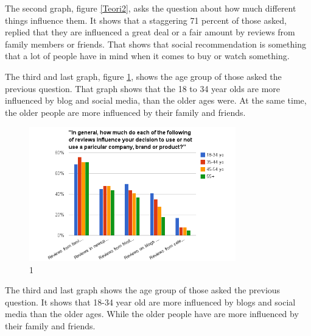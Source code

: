 The second graph, figure \ref{Teori2}, asks the question about how much different things influence them. It shows that a staggering 71 percent of those asked, replied that they are influenced a great deal or a fair amount by reviews from family members or friends. That shows that social recommendation is something that a lot of people have in mind when it comes to buy or watch something.

The third and last graph, figure \ref{Teori3}, shows the age group of those asked the previous question. That graph shows that the 18 to 34 year olds are more influenced by blog and social media, than the older ages were. At the same time, the older people are more influenced by their family and friends.

\begin{figure}[H]
\centering
\includegraphics[width=0.8\textwidth]{Images/teori3.png}
\caption{1}
\label{Teori3}
\end{figure}

The third and last graph shows the age group of those asked the previous question. It shows that 18-34 year old are more influenced by blogs and social media than the older ages. While the older people have are more influenced by their family and friends.